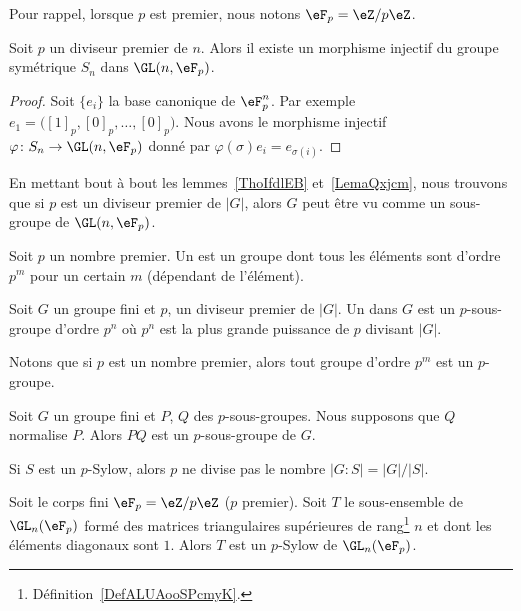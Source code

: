 Pour rappel, lorsque \( p\) est premier, nous notons \( \eF_p=\eZ/p\eZ\).

\begin{lemma}       \label{LemaQxjcm}
	Soit \( p\) un diviseur premier de \( n\). Alors il existe un morphisme injectif du groupe symétrique \( S_n\) dans \( \GL(n,\eF_p)\).
\end{lemma}

\begin{proof}
	Soit \( \{ e_i \}\) la base canonique de \( \eF_p^n\). Par exemple \( e_1=\big( [1]_p,[0]_p,\ldots, [0]_p \big)\). Nous avons le morphisme injectif \( \varphi\colon S_n\to \GL(n,\eF_p)\) donné par \( \varphi(\sigma)e_i=e_{\sigma(i)}\).
\end{proof}

\begin{remark}  \label{RemFzxxst}
	En mettant bout à bout les lemmes~\ref{ThoIfdlEB} et~\ref{LemaQxjcm}, nous trouvons que si \( p\) est un diviseur premier de \( | G |\), alors \( G\) peut être vu comme un sous-groupe de \( \GL(n,\eF_p)\).
\end{remark}

\begin{definition}      \label{DEFooPRCHooVZdwST}
	Soit \( p\) un nombre premier. Un  est un groupe dont tous les éléments sont d'ordre \( p^m\) pour un certain \( m\) (dépendant de l'élément).

	Soit \( G\) un groupe fini et \( p\), un diviseur premier de \( | G |\). Un  dans \( G\) est un \( p\)-sous-groupe d'ordre \( p^n\) où \( p^n\) est la plus grande puissance de \( p\) divisant \( | G |\).
\end{definition}
Notons que si \( p\) est un nombre premier, alors tout groupe d'ordre \( p^m\) est un \( p\)-groupe.

\begin{lemma}
	Soit \( G\) un groupe fini et \( P\), \( Q\) des \( p\)-sous-groupes. Nous supposons que \( Q\) normalise \( P\). Alors \( PQ\) est un \( p\)-sous-groupe de \( G\).
\end{lemma}

Si \( S\) est un \( p\)-Sylow, alors \( p\) ne divise pas le nombre \( | G:S |=| G |/| S |\).

\begin{proposition}     \label{Propvocmon}
	Soit le corps fini \( \eF_p=\eZ/p\eZ\) (\( p\) premier). Soit \( T\) le sous-ensemble de \( \GL_n(\eF_p)\) formé des matrices triangulaires supérieures de rang\footnote{Définition~\ref{DefALUAooSPcmyK}.} \( n\) et dont les éléments diagonaux sont \( 1\). Alors \( T\) est un \( p\)-Sylow de \( \GL_n(\eF_p)\).
\end{proposition}

